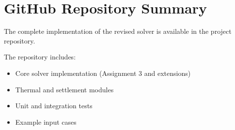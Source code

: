 \section{GitHub Repository Summary}

The complete implementation of the revised solver is available in the project repository.

The repository includes:
\begin{itemize}
    \item Core solver implementation (Assignment 3 and extensions)
    \item Thermal and settlement modules
    \item Unit and integration tests
    \item Example input cases
\end{itemize}

